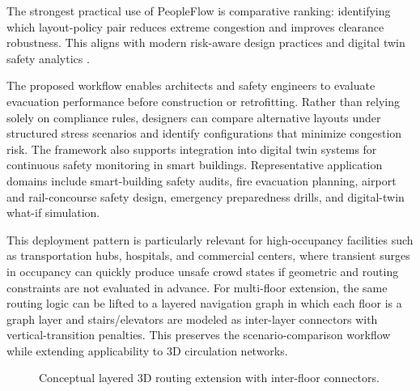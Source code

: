\documentclass[journal]{IEEEtran}
\begin{document}
The strongest practical use of PeopleFlow is comparative ranking: identifying which layout-policy pair reduces extreme congestion and improves clearance robustness. This aligns with modern risk-aware design practices and digital twin safety analytics \cite{haghani2020,kuligowski}.

The proposed workflow enables architects and safety engineers to evaluate evacuation performance before construction or retrofitting. Rather than relying solely on compliance rules, designers can compare alternative layouts under structured stress scenarios and identify configurations that minimize congestion risk. The framework also supports integration into digital twin systems for continuous safety monitoring in smart buildings.
Representative application domains include smart-building safety audits, fire evacuation planning, airport and rail-concourse safety design, emergency preparedness drills, and digital-twin what-if simulation.

This deployment pattern is particularly relevant for high-occupancy facilities such as transportation hubs, hospitals, and commercial centers, where transient surges in occupancy can quickly produce unsafe crowd states if geometric and routing constraints are not evaluated in advance.
For multi-floor extension, the same routing logic can be lifted to a layered navigation graph in which each floor is a graph layer and stairs/elevators are modeled as inter-layer connectors with vertical-transition penalties. This preserves the scenario-comparison workflow while extending applicability to 3D circulation networks.

\begin{figure}[!htbp]
\centering
{}
\caption{Conceptual layered 3D routing extension with inter-floor connectors.}
\label{fig:layered_3d}
\end{figure}
\end{document}
